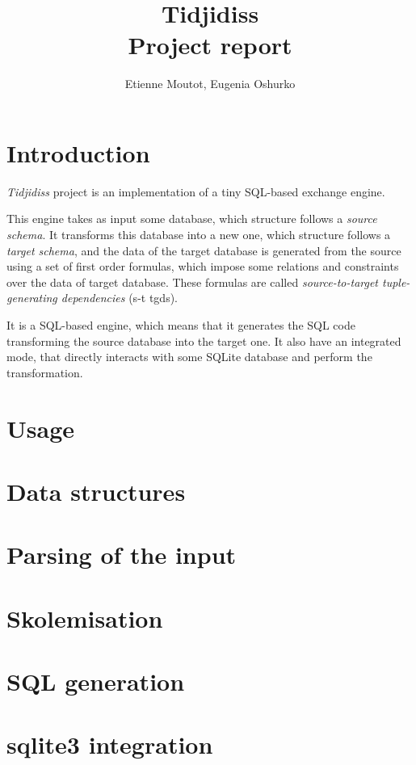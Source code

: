 \documentclass[a4paper,11pt]{article}
\title{{\Huge Tidjidiss}\\
Project report}
\author{Etienne Moutot, Eugenia Oshurko}
\begin{document}
\maketitle

\section{Introduction}
\textit{Tidjidiss} project is an implementation of a tiny SQL-based exchange engine.

This engine takes as input some database, which structure follows a \textit{source schema}. It transforms this database into a new one, which structure follows a \textit{target schema}, and the data of the target database is generated from the source using a set of first order formulas, which impose some relations and constraints over the data of target database. These formulas are called \textit{source-to-target tuple-generating dependencies} (s-t tgds).

It is a SQL-based engine, which means that it generates the SQL code transforming the source database into the target one. It also have an integrated mode, that directly interacts with some SQLite database and perform the transformation.

\section{Usage}
\section{Data structures}
\section{Parsing of the input}
\section{Skolemisation}
\section{SQL generation}
\section{sqlite3 integration}
\end{document}
